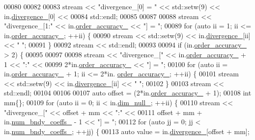 \begin{DoxyCode}
00080 
00082 
00083   stream << \textcolor{stringliteral}{"divergence\_[0] = "} << std::setw(9) << in.\hyperlink{classmtk_1_1Div1D_a0f96410051ba1fa6d91dfa7b7eacead9}{divergence\_}[0] <<
00084     std::endl;
00085 
00087 
00088   stream << \textcolor{stringliteral}{"divergence\_[1:"} << in.\hyperlink{classmtk_1_1Div1D_a9c8a8d7cd08a72dbd1daa8deee06f9c6}{order\_accuracy\_} << \textcolor{stringliteral}{"] = "};
00089   \textcolor{keywordflow}{for} (\textcolor{keyword}{auto} ii = 1; ii <= in.\hyperlink{classmtk_1_1Div1D_a9c8a8d7cd08a72dbd1daa8deee06f9c6}{order\_accuracy\_}; ++ii) \{
00090     stream << std::setw(9) << in.\hyperlink{classmtk_1_1Div1D_a0f96410051ba1fa6d91dfa7b7eacead9}{divergence\_}[ii] << \textcolor{stringliteral}{" "};
00091   \}
00092   stream << std::endl;
00093 
00094   \textcolor{keywordflow}{if} (in.\hyperlink{classmtk_1_1Div1D_a9c8a8d7cd08a72dbd1daa8deee06f9c6}{order\_accuracy\_} > 2) \{
00095 
00097 
00098     stream << \textcolor{stringliteral}{"divergence\_["} << in.\hyperlink{classmtk_1_1Div1D_a9c8a8d7cd08a72dbd1daa8deee06f9c6}{order\_accuracy\_} + 1 << \textcolor{stringliteral}{":"} <<
00099       2*in.\hyperlink{classmtk_1_1Div1D_a9c8a8d7cd08a72dbd1daa8deee06f9c6}{order\_accuracy\_} << \textcolor{stringliteral}{"] = "};
00100     \textcolor{keywordflow}{for} (\textcolor{keyword}{auto} ii = in.\hyperlink{classmtk_1_1Div1D_a9c8a8d7cd08a72dbd1daa8deee06f9c6}{order\_accuracy\_} + 1; ii <= 2*in.
      \hyperlink{classmtk_1_1Div1D_a9c8a8d7cd08a72dbd1daa8deee06f9c6}{order\_accuracy\_}; ++ii) \{
00101       stream << std::setw(9) << in.\hyperlink{classmtk_1_1Div1D_a0f96410051ba1fa6d91dfa7b7eacead9}{divergence\_}[ii] << \textcolor{stringliteral}{" "};
00102     \}
00103     stream << std::endl;
00104 
00106 
00107     \textcolor{keyword}{auto} offset = (2*in.\hyperlink{classmtk_1_1Div1D_a9c8a8d7cd08a72dbd1daa8deee06f9c6}{order\_accuracy\_} + 1);
00108     \textcolor{keywordtype}{int} mm\{\};
00109     \textcolor{keywordflow}{for} (\textcolor{keyword}{auto} ii = 0; ii < in.\hyperlink{classmtk_1_1Div1D_a264027144def76d802778391f55381a0}{dim\_null\_}; ++ii) \{
00110       stream << \textcolor{stringliteral}{"divergence\_["} << offset + mm << \textcolor{stringliteral}{":"} <<
00111         offset + mm + in.\hyperlink{classmtk_1_1Div1D_a717240b41eaa2adde858630b9e3d3042}{num\_bndy\_coeffs\_} - 1 << \textcolor{stringliteral}{"] = "};
00112       \textcolor{keywordflow}{for} (\textcolor{keyword}{auto} jj = 0; jj < in.\hyperlink{classmtk_1_1Div1D_a717240b41eaa2adde858630b9e3d3042}{num\_bndy\_coeffs\_}; ++jj) \{
00113         \textcolor{keyword}{auto} value = in.\hyperlink{classmtk_1_1Div1D_a0f96410051ba1fa6d91dfa7b7eacead9}{divergence\_}[offset + mm];

\end{DoxyCode}
